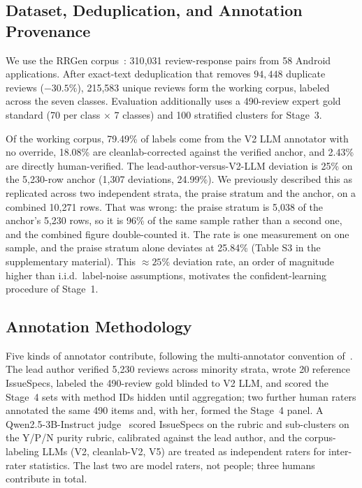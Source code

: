 \documentclass[preprint,12pt]{elsarticle}
\begin{document}
\subsection{Dataset, Deduplication, and Annotation Provenance}
We use the RRGen corpus~\cite{gao2019automating}: 310{,}031 review-response pairs from 58 Android
applications. After exact-text deduplication that removes $94{,}448$ duplicate reviews
($-30.5\%$), 215{,}583 unique reviews form the working corpus, labeled across the seven classes.
Evaluation additionally uses a 490-review expert gold standard (70 per class $\times$ 7 classes)
and 100 stratified clusters for Stage~3.

Of the working corpus, 79.49\% of labels come from the V2 LLM annotator with no override, 18.08\%
are cleanlab-corrected against the verified anchor, and 2.43\% are directly human-verified. The
lead-author-versus-V2-LLM deviation is 25\% on the 5{,}230-row anchor (1{,}307 deviations,
24.99\%). We previously described this as replicated across two independent strata, the praise
stratum and the anchor, on a combined 10{,}271 rows. That was wrong: the praise stratum is 5{,}038
of the anchor's 5{,}230 rows, so it is 96\% of the same sample rather than a second one, and the
combined figure double-counted it. The rate is one measurement on one sample, and the praise
stratum alone deviates at 25.84\% (Table S3 in the supplementary material). This $\approx 25\%$ deviation
rate, an order of magnitude higher than i.i.d.\ label-noise assumptions, motivates the
confident-learning procedure of Stage~1.

\subsection{Annotation Methodology}
Five kinds of annotator contribute, following the multi-annotator convention
of~\cite{gilardi2023chatgpt, pangakis2023automated}. The lead author verified 5{,}230 reviews
across minority strata, wrote 20 reference IssueSpecs, labeled the 490-review gold blinded to V2
LLM, and scored the Stage~4 sets with method IDs hidden until aggregation; two further human
raters annotated the same 490 items and, with her, formed the Stage~4 panel. A Qwen2.5-3B-Instruct
judge~\cite{zheng2023judging} scored IssueSpecs on the rubric and sub-clusters on the Y/P/N purity
rubric, calibrated against the lead author, and the corpus-labeling LLMs (V2, cleanlab-V2, V5) are
treated as independent raters for inter-rater statistics. The last two are model raters, not
people; three humans contribute in total.
\end{document}
